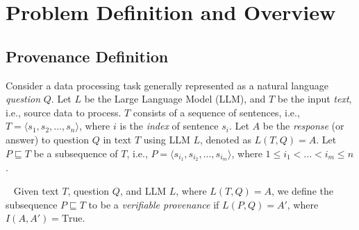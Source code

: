 \section{Problem Definition and Overview} 
\label{sec:def}

\vspace{-1mm}
\subsection{Provenance Definition} \label{sec:prov-def}
Consider a data processing task generally represented as a natural language {\em question} $Q$. 
Let $L$ be the Large Language Model (LLM), and $T$ be the input {\em text}, 
i.e., source data to process.  
$T$ consists of a sequence of sentences, 
i.e., $T = \langle s_1, s_2, \ldots, s_n \rangle$, 
where $i$ is the {\em index} of sentence $s_i$. 
Let $A$ be the {\em response} (or answer) 
to question $Q$ in text $T$ using LLM $L$, 
denoted as $L(T, Q) = A$. 
Let $P \sqsubseteq T$ be a subsequence of $T$, i.e., 
$P = \langle s_{i_1},s_{i_2},...,s_{i_m} \rangle$, where $1 \leq i_1 < ... < i_m \leq n$. 



\begin{definition}
    ~\label{def:provenance} Given text $T$, question $Q$, and LLM $L$, where $L(T, Q) = A$, we define the subsequence $P\sqsubseteq T$ to be a {\em verifiable provenance} if $L(P, Q) = A'$, where $I(A, A') = \text{True}$. 
\end{definition}
\vspace{-3mm}


